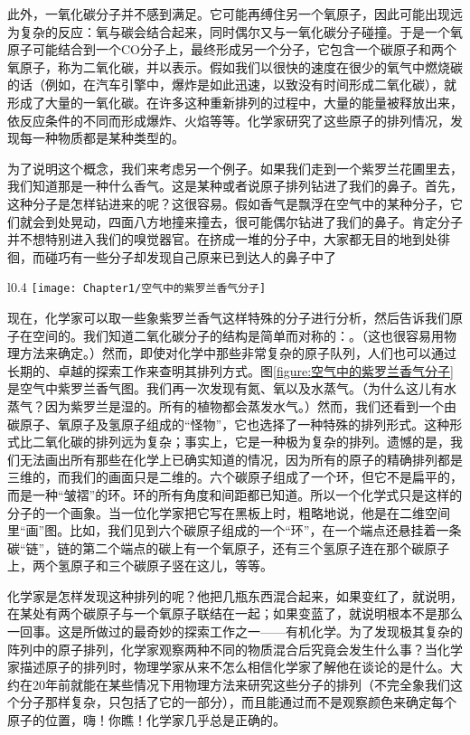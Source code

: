 此外，一氧化碳分子并不感到满足。它可能再缚住另一个氧原子，因此可能出现远为复杂的反应：氧与碳会结合起来，同时偶尔又与一氧化碳分子碰撞。于是一个氧原子可能结合到一个CO分子上，最终形成另一个分子，它包含一个碳原子和两个氧原子，称为二氧化碳，并以表示。假如我们以很快的速度在很少的氧气中燃烧碳的话（例如，在汽车引擎中，爆炸是如此迅速，以致没有时间形成二氧化碳），就形成了大量的一氧化碳。在许多这种重新排列的过程中，大量的能量被释放出来，依反应条件的不同而形成爆炸、火焰等等。化学家研究了这些原子的排列情况，发现每一种物质都是某种类型的。

为了说明这个概念，我们来考虑另一个例子。如果我们走到一个紫罗兰花圃里去，我们知道那是一种什么香气。这是某种或者说原子排列钻进了我们的鼻子。首先，这种分子是怎样钻进来的呢？这很容易。假如香气是飘浮在空气中的某种分子，它们就会到处晃动，四面八方地撞来撞去，很可能偶尔钻进了我们的鼻子。肯定分子并不想特别进入我们的嗅觉器官。在挤成一堆的分子中，大家都无目的地到处徘徊，而碰巧有一些分子却发现自己原来已到达人的鼻子中了

\begin{wrapfigure}{l}{0.4\textwidth}
    \centering
    \texttt{[image: Chapter1/空气中的紫罗兰香气分子]}
    \caption{空气中的紫罗兰香气分子}
    \label{figure:空气中的紫罗兰香气分子}
\end{wrapfigure}
现在，化学家可以取一些象紫罗兰香气这样特殊的分子进行分析，然后告诉我们原子在空间的。我们知道二氧化碳分子的结构是简单而对称的：。（这也很容易用物理方法来确定。）然而，即使对化学中那些非常复杂的原子队列，人们也可以通过长期的、卓越的探索工作来查明其排列方式。图\ref{figure:空气中的紫罗兰香气分子}是空气中紫罗兰香气图。我们再一次发现有氮、氧以及水蒸气。（为什么这儿有水蒸气？因为紫罗兰是湿的。所有的植物都会蒸发水气。）然而，我们还看到一个由碳原子、氧原子及氢原子组成的“怪物”，它也选择了一种特殊的排列形式。这种形式比二氧化碳的排列远为复杂；事实上，它是一种极为复杂的排列。遗憾的是，我们无法画出所有那些在化学上已确实知道的情况，因为所有的原子的精确排列都是三维的，而我们的画面只是二维的。六个碳原子组成了一个环，但它不是扁平的，而是一种“皱褶”的环。环的所有角度和间距都已知道。所以一个化学式只是这样的分子的一个画象。当一位化学家把它写在黑板上时，粗略地说，他是在二维空间里“画”图。比如，我们见到六个碳原子组成的一个“环”，在一个端点还悬挂着一条碳“链”，链的第二个端点的碳上有一个氧原子，还有三个氢原子连在那个碳原子上，两个氢原子和三个碳原子竖在这儿，等等。

化学家是怎样发现这种排列的呢？他把几瓶东西混合起来，如果变红了，就说明，在某处有两个碳原子与一个氧原子联结在一起；如果变蓝了，就说明根本不是那么一回事。这是所做过的最奇妙的探索工作之一——有机化学。为了发现极其复杂的阵列中的原子排列，化学家观察两种不同的物质混合后究竟会发生什么事？当化学家描述原子的排列时，物理学家从来不怎么相信化学家了解他在谈论的是什么。大约在20年前就能在某些情况下用物理方法来研究这些分子的排列（不完全象我们这个分子那样复杂，只包括了它的一部分），而且能通过而不是观察颜色来确定每个原子的位置，嗨！你瞧！化学家几乎总是正确的。

